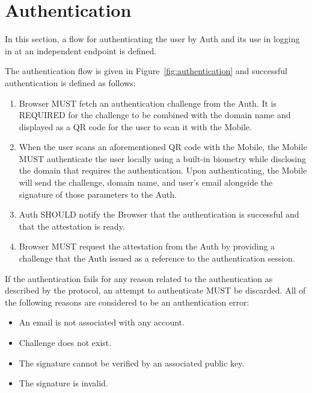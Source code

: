 \section{Authentication}
In this section, a flow for authenticating the user by Auth and its use in logging in at an independent endpoint
is defined.
\medskip

The authentication flow is given in Figure~\ref{fig:authentication} and successful authentication is defined as 
follows:
    \begin{enumerate}
        \item Browser MUST fetch an authentication challenge from the Auth. It is REQUIRED for the challenge 
                to be combined with the domain name and displayed as a QR code for the user to scan it with 
                the Mobile.
        \item When the user scans an aforementioned QR code with the Mobile, the Mobile MUST authenticate the 
                user locally using a built-in biometry while disclosing the domain that requires the authentication.
                Upon authenticating, the Mobile will send the challenge, domain name, and user's email alongside the
                signature of those parameters to the Auth.
        \item Auth SHOULD notify the Browser that the authentication is successful and that the attestation is
                ready.
        \item Browser MUST request the attestation from the Auth by providing a challenge that the Auth issued 
                as a reference to the authentication session.
    \end{enumerate}
    
If the authentication fails for any reason related to the authentication as described by the protocol, an attempt to 
authenticate MUST be discarded. All of the following reasons are considered to be an authentication error:
    \begin{itemize}
        \item An email is not associated with any account.
        \item Challenge does not exist.
        \item The signature cannot be verified by an associated public key.
        \item The signature is invalid.
    \end{itemize}

